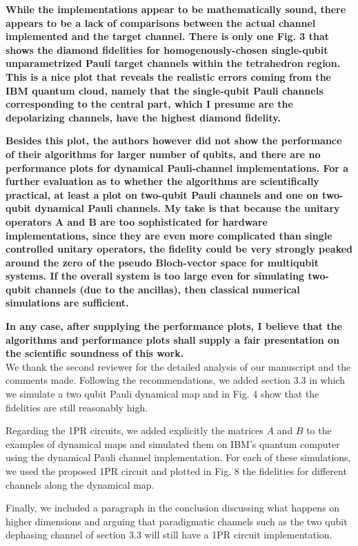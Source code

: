 \documentclass[10pt,letterpaper]{article} %
\begin{document}
\textbf{While the implementations appear to be mathematically sound, there
appears to be a lack of comparisons between the actual channel
implemented and the target channel. There is only one Fig. 3 that
shows the diamond fidelities for homogenously-chosen single-qubit
unparametrized Pauli target channels within the tetrahedron region.
This is a nice plot that reveals the realistic errors coming from the
IBM quantum cloud, namely that the single-qubit Pauli channels
corresponding to the central part, which I presume are the
depolarizing channels, have the highest diamond fidelity.}

\textbf{
Besides this plot, the authors however did not show the performance of
their algorithms for larger number of qubits, and there are no
performance plots for dynamical Pauli-channel implementations. For a
further evaluation as to whether the algorithms are scientifically
practical, at least a plot on two-qubit Pauli channels and one on
two-qubit dynamical Pauli channels. My take is that because the
unitary operators A and B are too sophisticated for hardware
implementations, since they are even more complicated than single
controlled unitary operators, the fidelity could be very strongly
peaked around the zero of the pseudo Bloch-vector space for multiqubit
systems. If the overall system is too large even for simulating
two-qubit channels (due to the ancillas), then classical numerical
simulations are sufficient.}

\textbf{
In any case, after supplying the performance plots, I believe that the
algorithms and performance plots shall supply a fair presentation on
the scientific soundness of this work.} \\$\;$\\


We thank the second reviewer for the detailed analysis
of our manuscript and the comments made. 
Following the recommendations, we 
added section 3.3 in which we simulate a two qubit Pauli dynamical map 
and in Fig. 4 show that the fidelities are still reasonably high. 

Regarding the 1PR circuits, we added explicitly the matrices $A$ and $B$
to the examples of dynamical maps and
simulated them on IBM's quantum computer
using the dynamical Pauli channel implementation.
For each of these simulations, we used the proposed 1PR circuit and plotted  in Fig. 8 the fidelities for
different channels along the dynamical map.

Finally, we included a paragraph in the conclusion discussing what happens on higher dimensions and arguing that paradigmatic
channels such as the two qubit dephasing channel of section 3.3 will still have a 
1PR circuit implementation. 
\end{document}
